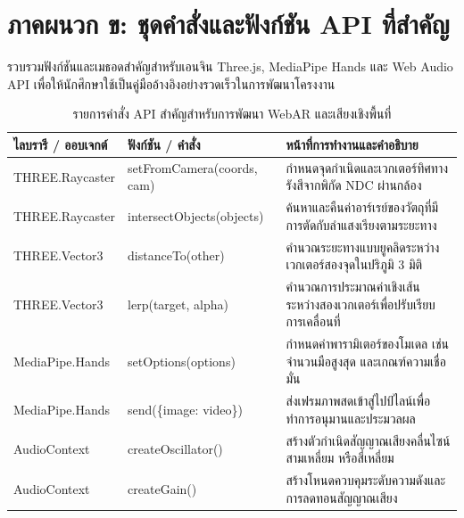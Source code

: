 \chapter*{ภาคผนวก ข: ชุดคำสั่งและฟังก์ชัน API ที่สำคัญ}

รวบรวมฟังก์ชันและเมธอดสำคัญสำหรับเอนจิน Three.js, MediaPipe Hands และ Web Audio API เพื่อให้นักศึกษาใช้เป็นคู่มืออ้างอิงอย่างรวดเร็วในการพัฒนาโครงงาน

\vspace{0.4cm}
\begin{table}[htbp]
\centering
\small
\begin{tabularx}{\textwidth}{>{\ttfamily\small}p{3.8cm} >{\ttfamily\small}p{4.2cm} X}
\toprule
\textbf{ไลบรารี / ออบเจกต์} & \textbf{ฟังก์ชัน / คำสั่ง} & \textbf{หน้าที่การทำงานและคำอธิบาย} \\
\midrule
THREE.Raycaster & setFromCamera(coords, cam) & กำหนดจุดกำเนิดและเวกเตอร์ทิศทางรังสีจากพิกัด NDC ผ่านกล้อง \\
THREE.Raycaster & intersectObjects(objects) & ค้นหาและคืนค่าอาร์เรย์ของวัตถุที่มีการตัดกับลำแสงเรียงตามระยะทาง \\
THREE.Vector3 & distanceTo(other) & คำนวณระยะทางแบบยูคลิดระหว่างเวกเตอร์สองจุดในปริภูมิ 3 มิติ \\
THREE.Vector3 & lerp(target, alpha) & คำนวณการประมาณค่าเชิงเส้นระหว่างสองเวกเตอร์เพื่อปรับเรียบการเคลื่อนที่ \\
MediaPipe.Hands & setOptions(options) & กำหนดค่าพารามิเตอร์ของโมเดล เช่น จำนวนมือสูงสุด และเกณฑ์ความเชื่อมั่น \\
MediaPipe.Hands & send(\{image: video\}) & ส่งเฟรมภาพสดเข้าสู่ไปป์ไลน์เพื่อทำการอนุมานและประมวลผล \\
AudioContext & createOscillator() & สร้างตัวกำเนิดสัญญาณเสียงคลื่นไซน์ สามเหลี่ยม หรือสี่เหลี่ยม \\
AudioContext & createGain() & สร้างโหนดควบคุมระดับความดังและการลดทอนสัญญาณเสียง \\
\bottomrule
\end{tabularx}
\caption{รายการคำสั่ง API สำคัญสำหรับการพัฒนา WebAR และเสียงเชิงพื้นที่}
\label{tab:api_reference}
\end{table}
